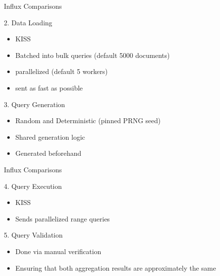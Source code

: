 \documentclass[compress,aspectratio=169]{beamer}
\begin{document}
\begin{frame}{Influx Comparisons}
\begin{block}{2. Data Loading}
  \begin{itemize}
    \item KISS
    \item Batched into bulk queries (default 5000 documents)
    \item parallelized (default 5 workers)
    \item sent as fast as possible
  \end{itemize}
\end{block}
\pause
\begin{block}{3. Query Generation}
  \begin{itemize}
  \item Random and Deterministic (pinned PRNG seed)
  \item Shared generation logic
  \item Generated beforehand
  \end{itemize}
\end{block}
\end{frame}


\begin{frame}{Influx Comparisons}
\begin{block}{4. Query Execution}
  \begin{itemize}
    \item KISS
    \item Sends parallelized range queries
  \end{itemize}
\end{block}
\pause
\begin{block}{5. Query Validation}
  \begin{itemize}
    \item Done via manual verification
    \item Ensuring that both aggregation results are approximately the same
  \end{itemize}
\end{block}
\end{frame}
\end{document}
